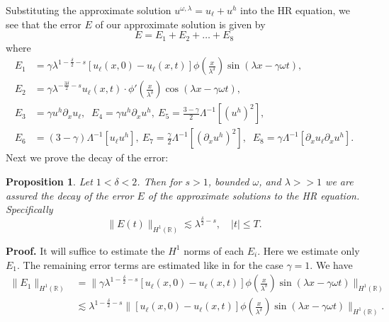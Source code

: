 \documentclass[12pt,reqno]{amsart}
\newcommand{\rr}{\mathbb{R}}
\newcommand{\p}{\partial}
\theoremstyle{plain}  %
\newtheorem{proposition}{Proposition}
\theoremstyle{definition}
\begin{document}
Substituting the
approximate solution $u^{\omega, \lambda} = u_\ell + u^h$ into the HR
equation, we see that the error
$E$ of our approximate solution is given by
%
%
\begin{equation*}
E=E_1 + E_2 + \dots + E_8
\end{equation*}
%
%
where
%
%
\begin{equation}
\label{all_errors_together}
\begin{split}
E_1 & = \gamma \lambda^{1 -\frac{\delta}{2}-s}  \left[ u_\ell(x,0) - u_\ell(x,t)
\right] \phi\left(
\frac{x}{\lambda^ \delta}
\right)\sin(\lambda x - \gamma \omega t),
\\
E_2 & = \gamma \lambda^{-\frac{3\delta}{2}-s}
u_\ell(x,t) \cdot \phi'\left( \frac{x}{\lambda^\delta} \right)\cos\left( \lambda
x - \gamma \omega t
\right),
\\
E_3 & = \gamma u^h \p_x u_\ell, \; \; E_4 = \gamma u^h \p_x u^h, \ E_5  = 
 \frac{3-\gamma}{2} \Lambda^{-1} \left[  \left( u^h \right)^2 \right], \\
E_6 & = (3- \gamma)\Lambda^{-1}
  \left[ u_\ell u^h \right], \  E_7 = \frac{\gamma}{2} \Lambda^{-1} \left[ 
 \left(
\p_x u^h \right)^2 \right ], \; \;
E_8 = \gamma \Lambda^{-1} \left[  \p_x u_\ell \p_x u^h \right]
.
\end{split}
\end{equation}
%
%
%
Next we prove the decay of the error:
%
%
\begin{proposition}
Let $1<\delta<2$. Then for $s > 1$, bounded $\omega$, and
$\lambda >>1$ we are assured the decay of the error $E$ of the
approximate solutions to the HR equation. Specifically
%
%
%
\begin{equation}
\label{E-est}
\|E(t)\|_{H^1(\rr)} \lesssim \lambda^{\frac{\delta}{2} -s}, \quad |t| \le 
T.
\end{equation}
%
%
%
\end{proposition}
%
%
%
{\bf Proof.}
It will suffice to estimate the $H^1$ norms of each $E_i$.
Here we estimate only $E_1$. 
The remaining error terms are estimated 
like in \cite{Himonas_2009_Non-uniform-dep} for the case $\gamma=1$.
We have
%
%
\begin{equation}
	\label{fw-est}
\begin{split}
\|E_1\|_{H^1(\rr)}
& = \| \gamma \lambda^{1 -\frac{\delta}{2}-s} \left[ u_\ell(x,0) - u_\ell(x,t) \right]
 \phi\left( \frac{x}{\lambda^\delta}
\right ) \sin (\lambda x - \gamma \omega t )\|_{H^1(\rr)}
\\
& \lesssim \lambda^{1 -\frac{\delta}{2} -s } \|\left[ u_\ell(x,0) - 
u_\ell(x,t)
\right] \phi\left( \frac{x}{\lambda^\delta} \right )
\sin\left( \lambda x - \gamma \omega t
\right) \|_{H^1(\rr)}.
\end{split}
\end{equation}
\end{document}
